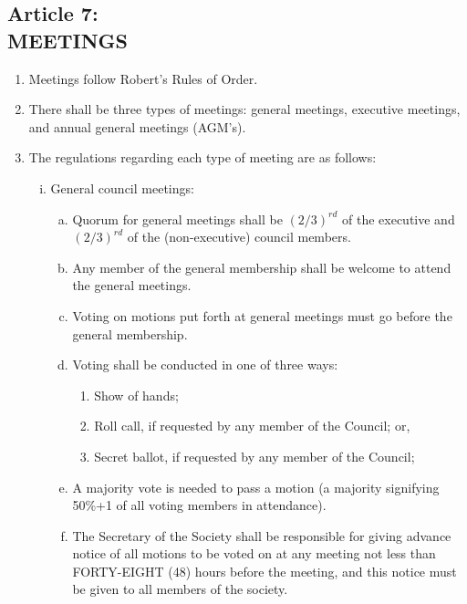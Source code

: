 \documentclass[]{report}
\begin{document}
\clearpage
\begin{center}
	\section*{Article 7:\\MEETINGS}
	\vspace{12px}
\end{center}
\label{meetings}
	\renewcommand{\theenumi}{\Alph{enumi}}
	\begin{enumerate}
		
		\item Meetings follow Robert's Rules of Order.
		\item There shall be three types of meetings: general meetings, executive meetings, and annual general meetings (AGM’s).
		\item The regulations regarding each type of meeting are as follows:
			\begin{enumerate}[i.]
				\item General council meetings:
					\begin{enumerate}[(a)]
						\item Quorum for general meetings shall be $ (2/3) ^{rd}$ of the executive and $ (2/3) ^{rd}$ of the (non-executive) council members.
						\item Any member of the general membership shall be welcome to attend the general meetings.
						\item Voting on motions put forth at general meetings must go before the general membership.
						\item Voting shall be conducted in one of three ways:
							\begin{enumerate}[(1)]
								\item Show of hands;
								\item Roll call, if requested by any member of the Council; or,
								\item Secret ballot, if requested by any member of the Council;
							\end{enumerate}
						\item A majority vote is needed to pass a motion (a majority signifying 50\%+1 of all voting members in attendance).
						\item The Secretary of the Society shall be responsible for giving advance notice of all motions to be voted on at any meeting not less than FORTY-EIGHT  (48) hours before the meeting, and this notice must be given to all members of the society.
					\end{enumerate}

\end{enumerate}
\end{enumerate}
\end{document}
